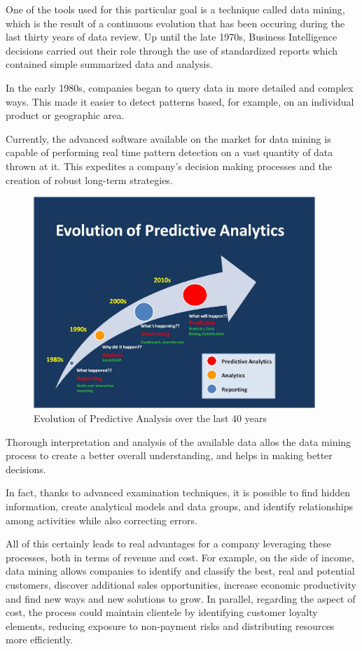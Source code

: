 One of the tools used for this particular goal is a technique called data mining, which is the result of a continuous evolution that has been occuring during the last thirty years of data review.
Up until the late 1970s, Business Intelligence decisions carried out their role through the use of standardized reports which contained simple summarized data and analysis.

In the early 1980s, companies began to query data in more detailed and complex ways. This made it easier to detect patterns based, for example, on an individual product or geographic area.

Currently, the advanced software available on the market for data mining is capable of performing real time pattern detection on a vast quantity of data thrown at it. This expedites a company’s decision making processes and the creation of robust long-term strategies.

\vspace{0.5cm}
\begin{figure}[htbp]
  \centering
    \includegraphics[height=8cm]{images/evolution}
  \caption{Evolution of Predictive Analysis over the last 40 years}
  \label{fig:predict}
\end{figure}
\vspace{0.5cm}
 

Thorough interpretation and analysis of the available data allos the data mining process to create a better overall understanding, and helps in making better decisions.

In fact, thanks to advanced examination techniques, it is possible to find hidden information, create analytical models and data groups, and identify relationships among activities while also correcting errors.

All of this certainly leads to real advantages for a company leveraging these processes, both in terms of revenue and cost. For example, on the side of income, data mining allows companies to identify and classify the best, real and potential customers, discover additional sales opportunities, increase economic productivity and find new ways and new solutions to grow. In parallel, regarding the aspect of cost, the process could maintain clientele by identifying customer loyalty elements, reducing exposure to non-payment risks and distributing resources more efficiently.


